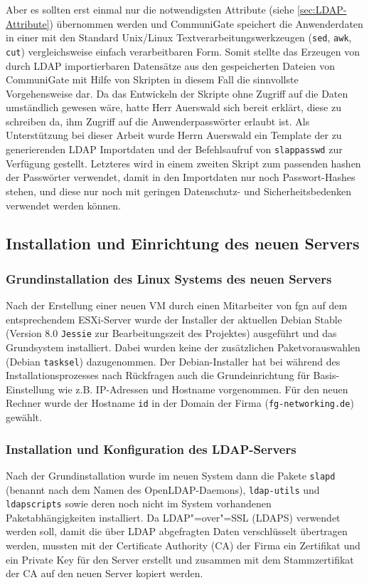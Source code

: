 \documentclass[11pt,a4paper,titlepage=firstiscover,headsepline,bibtotoc]{scrartcl} %
\begin{document}
Aber es sollten erst einmal nur die notwendigsten Attribute (siehe \autoref{sec:LDAP-Attribute}) übernommen werden und CommuniGate speichert die Anwenderdaten in einer mit den Standard Unix/Linux Textverarbeitungswerkzeugen (\texttt{sed}, \texttt{awk}, \texttt{cut}) vergleichsweise einfach verarbeitbaren Form. Somit stellte das Erzeugen von durch LDAP importierbaren Datensätze aus den gespeicherten Dateien von CommuniGate mit Hilfe von Skripten in diesem Fall die sinnvollste Vorgehensweise dar. Da das Entwickeln der Skripte ohne Zugriff auf die Daten umständlich gewesen wäre, hatte Herr Auerswald sich bereit erklärt, diese zu schreiben da, ihm Zugriff auf die Anwenderpasswörter erlaubt ist. Als Unterstützung bei dieser Arbeit wurde Herrn Auerswald ein Template der zu generierenden LDAP Importdaten und der Befehlsaufruf von \texttt{slappasswd} zur Verfügung gestellt. Letzteres wird in einem zweiten Skript zum passenden hashen der Passwörter verwendet, damit in den Importdaten nur noch Passwort-Hashes stehen, und diese nur noch mit geringen Datenschutz- und Sicherheitsbedenken verwendet werden können.

\subsection{Installation und Einrichtung des neuen Servers}
\subsubsection{Grundinstallation des Linux Systems des neuen Servers}
Nach der Erstellung einer neuen VM durch einen Mitarbeiter von fgn auf dem entsprechendem ESXi-Server wurde der Installer der aktuellen Debian Stable (Version 8.0 \texttt{Jessie} zur Bearbeitungszeit des Projektes) ausgeführt und das Grundsystem installiert. Dabei wurden keine der zusätzlichen Paketvorauswahlen (Debian \texttt{tasksel}) dazugenommen.  Der Debian-Installer hat bei während des Installationsprozesses nach Rückfragen auch die Grundeinrichtung für Basis-Einstellung wie z.B. IP-Adressen und Hostname vorgenommen. Für den neuen Rechner wurde der Hostname \texttt{id} in der Domain der Firma (\texttt{fg-networking.de}) gewählt.

\subsubsection{Installation und Konfiguration des LDAP-Servers}
Nach der Grundinstallation wurde im neuen System dann die Pakete \texttt{slapd} (benannt nach dem Namen des OpenLDAP-Daemons), \texttt{ldap-utils} und \texttt{ldapscripts} sowie deren noch nicht im System vorhandenen Paketabhängigkeiten installiert. Da LDAP"=over"=SSL (LDAPS) verwendet werden soll, damit die über LDAP abgefragten Daten verschlüsselt übertragen werden, mussten mit der Certificate Authority (CA) der Firma ein Zertifikat und ein Private Key für den Server erstellt und zusammen mit dem Stammzertifikat der CA auf den neuen Server kopiert werden.
\end{document}
